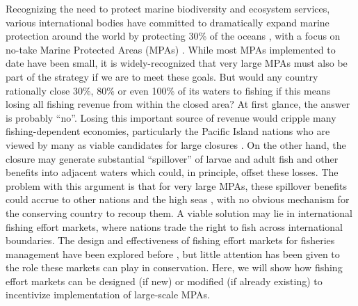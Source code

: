 \documentclass[12pt]{article}
\begin{document}
Recognizing the need to protect marine biodiversity and ecosystem services, various international bodies have committed to dramatically expand marine protection around the world by protecting 30\% of the oceans \cite{oleary_2016,dinerstein_2019}, with a focus on no-take Marine Protected Areas (MPAs) \cite{sala_2017,sala_2018}. While most MPAs implemented to date have been small, it is widely-recognized that very large MPAs must also be part of the strategy if we are to meet these goals. But would any country rationally close 30\%, 80\% or even 100\% of its waters to fishing if this means losing all fishing revenue from within the closed area? At first glance, the answer is probably ``no''. Losing this important source of revenue would cripple many fishing-dependent economies, particularly the Pacific Island nations who are viewed by many as viable candidates for large closures \cite{mcleod_2019}. On the other hand, the closure may generate substantial ``spillover'' of larvae and adult fish \cite{ramesh_2019,hernndez_2019} and other benefits into adjacent waters which could, in principle, offset these losses. The problem with this argument is that for very large MPAs, these spillover benefits could accrue to other nations and the high seas \cite{agardy_2018}, with no obvious mechanism for the conserving country to recoup them. A viable solution may lie in international fishing effort markets, where nations trade the right to fish across international boundaries. The design and effectiveness of fishing effort markets for fisheries management have been explored before \cite{havice_2010,havice_2013}, but little attention has been given to the role these markets can play in conservation. Here, we will show how fishing effort markets can be designed (if new) or modified (if already existing) to incentivize implementation of large-scale MPAs.
\end{document}
